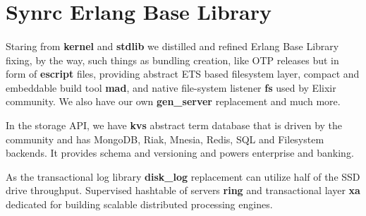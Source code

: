 \documentclass[11pt]{article}
\begin{document}


\section*{Synrc Erlang Base Library}
\paragraph{}

Staring from {\bf kernel} and {\bf stdlib} we distilled and refined
Erlang Base Library fixing, by the way, such things as
bundling creation, like OTP releases but in form of
{\bf escript} files, providing abstract ETS based filesystem layer,
compact and embeddable build tool {\bf mad}, and native file-system
listener {\bf fs} used by Elixir community. We also have our own
{\bf gen_server} replacement and much more.

In the storage API, we have {\bf kvs} abstract term database
that is driven by the community and has MongoDB, Riak, Mnesia, Redis, SQL
and Filesystem backends. It provides schema and versioning
and powers enterprise and banking.

As the transactional log library {\bf disk_log} replacement can
utilize half of the SSD drive throughput. Supervised hashtable
of servers {\bf ring} and transactional layer {\bf xa} dedicated for building
scalable distributed processing engines.



\end{document}
